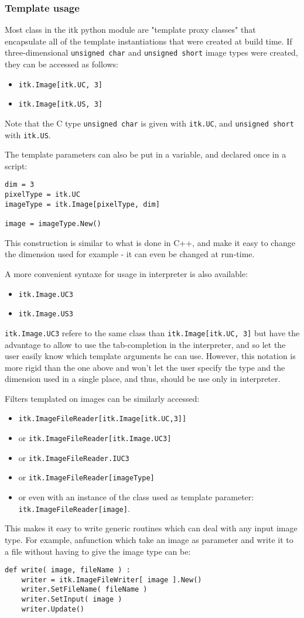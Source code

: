 \documentclass{InsightArticle}
\begin{document}
     \subsubsection{Template usage}
Most class in the itk python module are "template proxy classes" that
encapsulate all of the template instantiations that were created at build time.
If three-dimensional \verb$unsigned char$ and \verb$unsigned short$ image types were created,
they can be accessed as follows:
\begin{itemize}
  \item \verb$itk.Image[itk.UC, 3]$
  \item \verb$itk.Image[itk.US, 3]$
\end{itemize}
Note that the C type \verb$unsigned char$ is given with \verb$itk.UC$, and \verb$unsigned short$
with \verb$itk.US$.

The template parameters can also be put in a variable, and declared once
in a script:
\begin{verbatim}
dim = 3
pixelType = itk.UC
imageType = itk.Image[pixelType, dim]

image = imageType.New()
\end{verbatim}
This construction is similar to what is done in C++, and make it easy to change
the dimension used for example - it can even be changed at run-time.

A more convenient syntaxe for usage in interpreter is also available:
\begin{itemize}
  \item \verb$itk.Image.UC3$
  \item \verb$itk.Image.US3$
\end{itemize}
\verb$itk.Image.UC3$ refere to the same class than \verb$itk.Image[itk.UC, 3]$
but have the advantage to allow to use the tab-completion in the interpreter,
and so let the user easily know which template arguments he can use.
However, this notation is more rigid than the one above and won't let the user
specify the type and the dimension used in a single place, and thus,
should be use only in interpreter.

Filters templated on images can be similarly accessed:
\begin{itemize}
  \item \verb$itk.ImageFileReader[itk.Image[itk.UC,3]]$
  \item or \verb$itk.ImageFileReader[itk.Image.UC3]$
  \item or \verb$itk.ImageFileReader.IUC3$
  \item or \verb$itk.ImageFileReader[imageType]$
  \item or even with an instance of the class used as template parameter: \verb$itk.ImageFileReader[image]$.
\end{itemize}
This makes it easy to write generic routines which
can deal with any input image type. For example, anfunction which take an image
as parameter and write it to a file without having to give the image type can be:
\begin{verbatim}
def write( image, fileName ) :
    writer = itk.ImageFileWriter[ image ].New()
    writer.SetFileName( fileName )
    writer.SetInput( image )
    writer.Update()
\end{verbatim}
\end{document}
